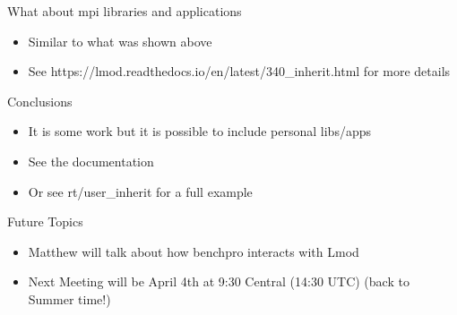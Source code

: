 \documentclass{beamer}
\begin{document}
\begin{frame}{What about mpi libraries and applications}
  \begin{itemize}
    \item Similar to what was shown above
    \item See  https://lmod.readthedocs.io/en/latest/340\_inherit.html
      for more details
  \end{itemize}
\end{frame}

\begin{frame}{Conclusions}
  \begin{itemize}
    \item It is some work but it is possible to include personal libs/apps
    \item See the documentation 
    \item Or see rt/user\_inherit for a full example
  \end{itemize}
\end{frame}

\begin{frame}{Future Topics}
  \begin{itemize}
    \item Matthew will talk about how benchpro interacts with Lmod
    \item Next Meeting will be April 4th at 9:30 Central (14:30 UTC)
      (back to Summer time!)
  \end{itemize}
\end{frame}
\end{document}
